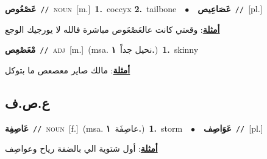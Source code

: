 \documentclass[10pt,a4paper,twoside]{article} %
\begin{document}
\begin{multicols}{2}
{\setlength\topsep{0pt}\textbf{\foreignlanguage{arabic}{عَصْعُوص}}\ {\color{gray}\texttt{//}\color{black}}\ \textsc{noun}\ [m.]\ \textbf{1.}~coccyx  \textbf{2.}~tailbone\ \ $\bullet$\ \ \setlength\topsep{0pt}\textbf{\foreignlanguage{arabic}{عَصَاعِيص}}\ {\color{gray}\texttt{//}\color{black}}\ [pl.]\  \begin{flushright}\color{gray}\foreignlanguage{arabic}{\textbf{\underline{\foreignlanguage{arabic}{أمثلة}}}: وقعتي كانت عالعَصْعَوص مباشرة فالله لا يورجيك الوجع}\end{flushright}\color{black}} \vspace{2mm}

{\setlength\topsep{0pt}\textbf{\foreignlanguage{arabic}{مْعَصْعِص}}\ {\color{gray}\texttt{//}\color{black}}\ \textsc{adj}\ [m.]\ \color{gray}(msa. \foreignlanguage{arabic}{نحيل جداً}~\foreignlanguage{arabic}{\textbf{١.}})\color{black}\ \textbf{1.}~skinny\  \begin{flushright}\color{gray}\foreignlanguage{arabic}{\textbf{\underline{\foreignlanguage{arabic}{أمثلة}}}: مالك صاير معصعص ما بتوكل}\end{flushright}\color{black}} \vspace{2mm}

\vspace{-3mm}
\subsection*{\color{blue}\foreignlanguage{arabic}{ع.ص.ف}\color{blue}{}} 

{\setlength\topsep{0pt}\textbf{\foreignlanguage{arabic}{عَاصِفِة}}\ {\color{gray}\texttt{//}\color{black}}\ \textsc{noun}\ [f.]\ \color{gray}(msa. \foreignlanguage{arabic}{عاصِفَة}~\foreignlanguage{arabic}{\textbf{١.}})\color{black}\ \textbf{1.}~storm\ \ $\bullet$\ \ \setlength\topsep{0pt}\textbf{\foreignlanguage{arabic}{عَوَاصِف}}\ {\color{gray}\texttt{//}\color{black}}\ [pl.]\  \begin{flushright}\color{gray}\foreignlanguage{arabic}{\textbf{\underline{\foreignlanguage{arabic}{أمثلة}}}: أول شتوية الي بالضفة رياح وعواصِف}\end{flushright}\color{black}} \vspace{2mm}


\end{multicols}
\end{document}
